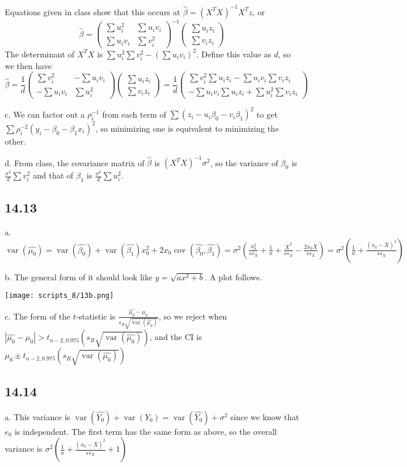 \documentclass{article}
\newcommand{\conj}{\overline}
\newcommand{\openm}{\begin{pmatrix}}
\newcommand{\closem}{\end{pmatrix}}
\DeclareMathOperator{\cov}{cov}
\DeclareMathOperator{\var}{var}
\begin{document}
Equations given in class show that this occurs at $\hat{\beta}=(X^TX)^{-1}X^Tz$, or
$$\hat{\beta}=\openm\sum u_i^2&\sum u_iv_i\\\sum u_iv_i&\sum v_i^2\closem^{-1}\openm\sum u_iz_i\\\sum v_iz_i\closem$$
The determinant of $X^TX$ is $\sum u_i^2\sum v_i^2-(\sum u_iv_i)^2$. Define this value as $d$, so we then have 
$$\hat{\beta}=\frac{1}{d}\openm\sum v_i^2&-\sum u_iv_i\\-\sum u_iv_i&\sum u_i^2\closem\openm\sum u_iz_i\\\sum v_iz_i\closem=\frac{1}{d}\openm\sum v_i^2\sum u_iz_i-\sum u_iv_i\sum v_iz_i\\-\sum u_iv_i\sum u_iz_i+\sum u_i^2\sum v_iz_i\closem$$

\noindent c. We can factor out a $\rho_i^{-1}$ from each term of $\sum(z_i-u_i\beta_0-v_i\beta_1)^2$ to get $\sum\rho_i^{-2}(y_i-\beta_0-\beta_1x_i)^2$, so minimizing one is equivalent to minimizing the other.

\noindent d. From class, the covariance matrix of $\hat{\beta}$ is $(X^TX)^{-1}\sigma^2$, so the variance of $\beta_0$ is $\frac{\sigma^2}{d}\sum v_i^2$ and that of $\beta_1$ is $\frac{\sigma^2}{d}\sum u_i^2$.
\subsection*{14.13}
a. $\var(\hat{\mu_0})=\var(\hat{\beta_0})+\var(\hat{\beta_1})x_0^2+2x_0\cov(\hat{\beta_0},\hat{\beta_1})=\sigma^2\left(\frac{x_0^2}{ss_X}+\frac{1}{n}+\frac{\conj{X}^2}{ss_X}-\frac{2x_0\conj{X}}{ss_X}\right)=\sigma^2\left(\frac{1}{n}+\frac{(x_0-\conj{X})^2}{ss_X}\right)$

\noindent b. The general form of it should look like $y=\sqrt{ax^2+b}$. A plot follows.

\texttt{[image: scripts\_8/13b.png]}

\noindent c. The form of the $t$-statistic is $\frac{\hat{\mu_0}-\mu_0}{s_R\sqrt{\var(\hat{\mu_0})}}$, so we reject when $|\hat{\mu_0}-\mu_0|>t_{n-2,0.975}(s_R\sqrt{\var(\hat{\mu_0})})$, and the CI is $\mu_0\pm t_{n-2,0.975}(s_R\sqrt{\var(\hat{\mu_0})})$
\subsection*{14.14}
a. This variance is $\var(\hat{Y_0})+\var(Y_0)=\var(\hat{Y_0})+\sigma^2$ since we know that $e_0$ is independent. The first term has the same form as above, so the overall variance is $\sigma^2\left(\frac{1}{n}+\frac{(x_0-\conj{X})^2}{ss_X}+1\right)$
\end{document}
